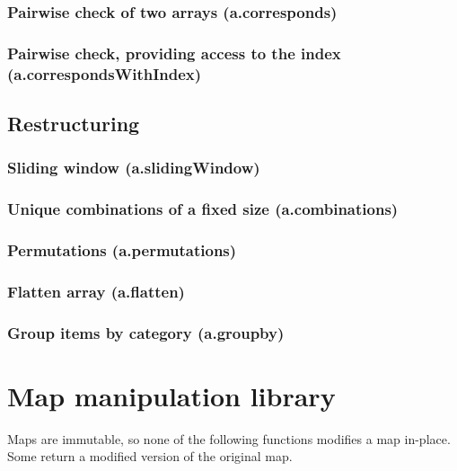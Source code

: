 \documentclass{article}
\theoremstyle{definition}
\begin{document}
\subsubsection{Pairwise check of two arrays (a.corresponds)}

\subsubsection{Pairwise check, providing access to the index (a.correspondsWithIndex)}

\subsection{Restructuring}

\subsubsection{Sliding window (a.slidingWindow)}

\subsubsection{Unique combinations of a fixed size (a.combinations)}

\subsubsection{Permutations (a.permutations)}

\subsubsection{Flatten array (a.flatten)}

\subsubsection{Group items by category (a.groupby)}

\pagebreak

\section{Map manipulation library}

Maps are immutable, so none of the following functions modifies a map in-place.  Some return a modified version of the original map.
\end{document}
